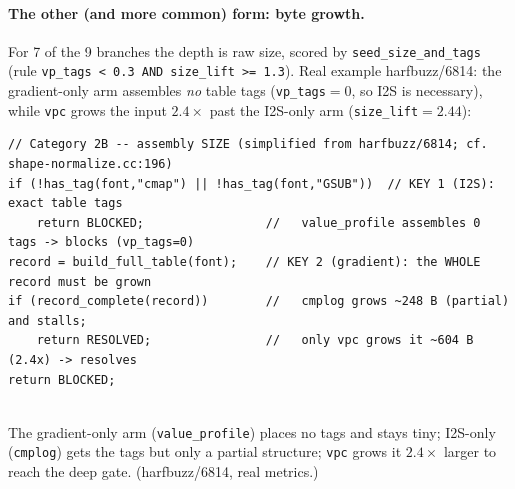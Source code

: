 \documentclass[11pt]{article}
\begin{document}
\paragraph{The other (and more common) form: byte growth.} For 7 of the 9 branches
the depth is raw size, scored by \texttt{seed\_size\_and\_tags} (rule \texttt{vp\_tags <
0.3 AND size\_lift >= 1.3}). Real example harfbuzz/6814: the gradient-only arm
assembles \emph{no} table tags (\texttt{vp\_tags}$=0$, so I2S is necessary), while
\texttt{vpc} grows the input $2.4\times$ past the I2S-only arm
(\texttt{size\_lift}$=2.44$):

\begin{lstlisting}[style=c]
// Category 2B -- assembly SIZE (simplified from harfbuzz/6814; cf. shape-normalize.cc:196)
if (!has_tag(font,"cmap") || !has_tag(font,"GSUB"))  // KEY 1 (I2S): exact table tags
    return BLOCKED;                 //   value_profile assembles 0 tags -> blocks (vp_tags=0)
record = build_full_table(font);    // KEY 2 (gradient): the WHOLE record must be grown
if (record_complete(record))        //   cmplog grows ~248 B (partial) and stalls;
    return RESOLVED;                //   only vpc grows it ~604 B (2.4x) -> resolves
return BLOCKED;
\end{lstlisting}

\begin{center}
\\[-1pt]
{\footnotesize The gradient-only arm (\texttt{value\_profile}) places no tags and
stays tiny; I2S-only (\texttt{cmplog}) gets the tags but only a partial
structure; \texttt{vpc} grows it $2.4\times$ larger to reach the deep gate.
(harfbuzz/6814, real metrics.)}
\end{center}
\end{document}
